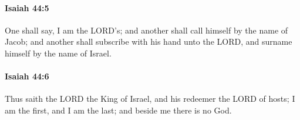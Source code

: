 		\paragraph{Isaiah 44:5} %
			\label{ISAIAH-44-5}

			One shall say, I am the LORD's; and another shall call himself by the name of Jacob; and another shall subscribe with his hand unto the LORD, and surname himself by the name of Israel.


		\paragraph{Isaiah 44:6} %
			\label{ISAIAH-44-6}

			Thus saith the LORD the King of Israel, and his redeemer the LORD of hosts; I am the first, and I am the last; and beside me there is no God.


